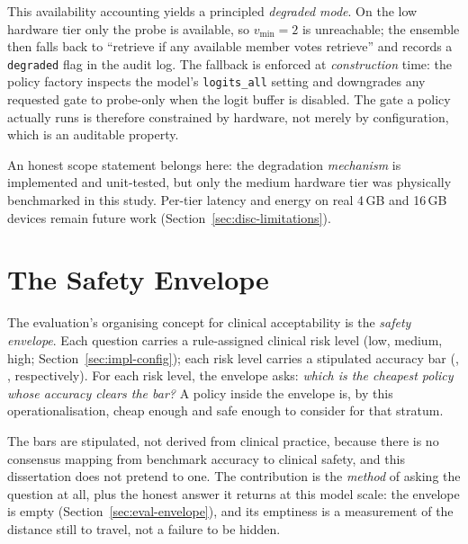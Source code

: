 This availability accounting yields a principled \emph{degraded mode}. On the
low hardware tier only the probe is available, so $v_{\min}=2$ is
unreachable; the ensemble then falls back to ``retrieve if any available
member votes retrieve'' and records a \texttt{degraded} flag in the audit
log. The fallback is enforced at \emph{construction} time: the policy factory
inspects the model's \texttt{logits\_all} setting and downgrades any
requested gate to probe-only when the logit buffer is disabled. The gate a
policy actually runs is therefore constrained by hardware, not merely by
configuration, which is an auditable property.

An honest scope statement belongs here: the degradation \emph{mechanism} is
implemented and unit-tested, but only the medium hardware tier was physically
benchmarked in this study. Per-tier latency and energy on real 4\,GB and
16\,GB devices remain future work
(Section~\ref{sec:disc-limitations}).

\section{The Safety Envelope}
\label{sec:method-envelope}

The evaluation's organising concept for clinical acceptability is the
\emph{safety envelope}. Each question carries a rule-assigned clinical risk
level (low, medium, high; Section~\ref{sec:impl-config}); each risk level
carries a stipulated accuracy bar (\barLow{}, \barMedium{}, \barHigh{}
respectively). For each risk level, the envelope asks: \emph{which is the
cheapest policy whose accuracy clears the bar?} A policy inside the envelope
is, by this operationalisation, cheap enough and safe enough to consider for
that stratum.

The bars are stipulated, not derived from clinical practice, because there is no
consensus mapping from benchmark accuracy to clinical safety, and this
dissertation does not pretend to one. The contribution is the \emph{method}
of asking the question at all, plus the honest answer it returns at this
model scale: the envelope is empty (Section~\ref{sec:eval-envelope}), and its
emptiness is a measurement of the distance still to travel, not a failure to
be hidden.